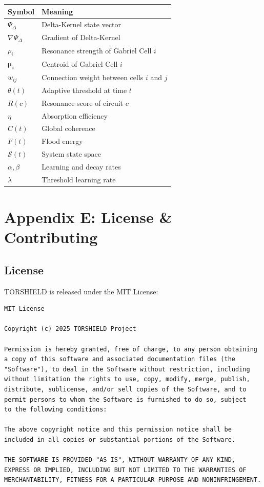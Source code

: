 \documentclass[11pt,a4paper]{article}
\begin{document}
\begin{table}[h]
\centering
\begin{tabular}{@{}ll@{}}
\toprule
\textbf{Symbol} & \textbf{Meaning} \\ \midrule
$\Psi_\Delta$ & Delta-Kernel state vector \\
$\nabla \Psi_\Delta$ & Gradient of Delta-Kernel \\
$\rho_i$ & Resonance strength of Gabriel Cell $i$ \\
$\boldsymbol{\mu}_i$ & Centroid of Gabriel Cell $i$ \\
$w_{ij}$ & Connection weight between cells $i$ and $j$ \\
$\theta(t)$ & Adaptive threshold at time $t$ \\
$R(c)$ & Resonance score of circuit $c$ \\
$\eta$ & Absorption efficiency \\
$C(t)$ & Global coherence \\
$F(t)$ & Flood energy \\
$\mathcal{S}(t)$ & System state space \\
$\alpha, \beta$ & Learning and decay rates \\
$\lambda$ & Threshold learning rate \\
\bottomrule
\end{tabular}
\end{table}

\section{Appendix E: License \& Contributing}

\subsection{License}

TORSHIELD is released under the MIT License:

\begin{verbatim}
MIT License

Copyright (c) 2025 TORSHIELD Project

Permission is hereby granted, free of charge, to any person obtaining 
a copy of this software and associated documentation files (the 
"Software"), to deal in the Software without restriction, including 
without limitation the rights to use, copy, modify, merge, publish, 
distribute, sublicense, and/or sell copies of the Software, and to 
permit persons to whom the Software is furnished to do so, subject 
to the following conditions:

The above copyright notice and this permission notice shall be 
included in all copies or substantial portions of the Software.

THE SOFTWARE IS PROVIDED "AS IS", WITHOUT WARRANTY OF ANY KIND, 
EXPRESS OR IMPLIED, INCLUDING BUT NOT LIMITED TO THE WARRANTIES OF 
MERCHANTABILITY, FITNESS FOR A PARTICULAR PURPOSE AND NONINFRINGEMENT.
\end{verbatim}
\end{document}
